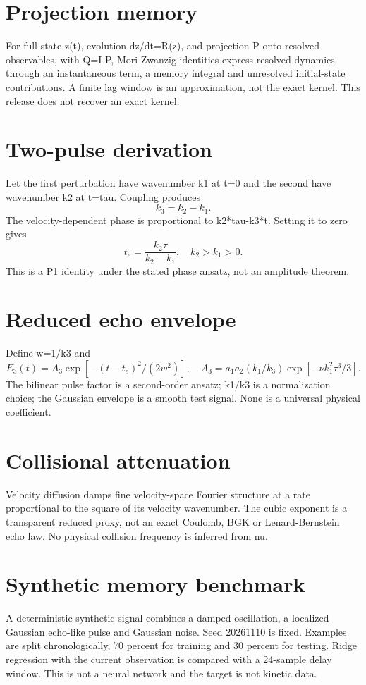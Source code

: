 \documentclass[11pt,a4paper]{article}
\begin{document}
\section{Projection memory}
For full state z(t), evolution dz/dt=R(z), and projection P onto resolved observables, with Q=I-P, Mori-Zwanzig identities express resolved dynamics through an instantaneous term, a memory integral and unresolved initial-state contributions. A finite lag window is an approximation, not the exact kernel. This release does not recover an exact kernel.
\cite{Zwanzig1961,Mori1965,Chorin2000,Burles2026}
\newpage
\section{Two-pulse derivation}
Let the first perturbation have wavenumber k1 at t=0 and the second have wavenumber k2 at t=tau. Coupling produces
\[
k_3=k_2-k_1.
\]
The velocity-dependent phase is proportional to k2*tau-k3*t. Setting it to zero gives
\[
t_e=\frac{k_2\tau}{k_2-k_1},\quad k_2>k_1>0.
\]
This is a P1 identity under the stated phase ansatz, not an amplitude theorem.
\newpage
\section{Reduced echo envelope}
Define w=1/k3 and
\[
E_3(t)=A_3\exp[-(t-t_e)^2/(2w^2)],
\quad A_3=a_1a_2(k_1/k_3)\exp[-\nu k_1^2\tau^3/3].
\]
The bilinear pulse factor is a second-order ansatz; k1/k3 is a normalization choice; the Gaussian envelope is a smooth test signal. None is a universal physical coefficient.
\newpage
\section{Collisional attenuation}
Velocity diffusion damps fine velocity-space Fourier structure at a rate proportional to the square of its velocity wavenumber. The cubic exponent is a transparent reduced proxy, not an exact Coulomb, BGK or Lenard-Bernstein echo law. No physical collision frequency is inferred from nu.
\cite{Ichikawa1969}
\newpage
\section{Synthetic memory benchmark}
A deterministic synthetic signal combines a damped oscillation, a localized Gaussian echo-like pulse and Gaussian noise. Seed 20261110 is fixed. Examples are split chronologically, 70 percent for training and 30 percent for testing. Ridge regression with the current observation is compared with a 24-sample delay window. This is not a neural network and the target is not kinetic data.
\newpage
\end{document}
